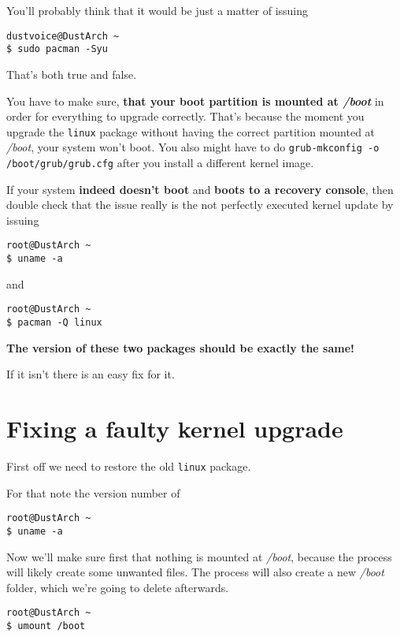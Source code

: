 \documentclass[10pt]{dustdoc}
\begin{document}
You’ll probably think that it would be just a matter of issuing

\begin{verbatim}
dustvoice@DustArch ~
$ sudo pacman -Syu
\end{verbatim}

That’s both true and false.

You have to make sure, \textbf{that your boot partition is mounted at \textit{/boot}} in order for everything to upgrade correctly.
That’s because the moment you upgrade the \texttt{linux} package without having the correct partition mounted at \textit{/boot}, your system won’t boot.
You also might have to do \texttt{grub-mkconfig -o /boot/grub/grub.cfg} after you install a different kernel image.

If your system \textbf{indeed doesn’t boot} and \textbf{boots to a recovery console}, then double check that the issue really is the not perfectly executed kernel update by issuing

\begin{verbatim}
root@DustArch ~
$ uname -a
\end{verbatim}

\noindent
and

\begin{verbatim}
root@DustArch ~
$ pacman -Q linux
\end{verbatim}

\textbf{The version of these two packages should be exactly the same!}

If it isn’t there is an easy fix for it.

\section{Fixing a faulty kernel upgrade}
\label{sec:fixing-a-faulty-kernel-upgrade}

First off we need to restore the old \texttt{linux} package.

For that note the version number of

\begin{verbatim}
root@DustArch ~
$ uname -a
\end{verbatim}

Now we’ll make sure first that nothing is mounted at \textit{/boot}, because the process will likely create some unwanted files.
The process will also create a new \textit{/boot} folder, which we’re going to delete afterwards.

\begin{verbatim}
root@DustArch ~
$ umount /boot
\end{verbatim}
\end{document}

